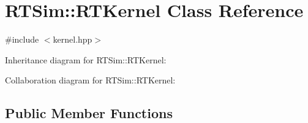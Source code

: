\hypertarget{classRTSim_1_1RTKernel}{}\section{R\+T\+Sim\+:\+:R\+T\+Kernel Class Reference}
\label{classRTSim_1_1RTKernel}


{\ttfamily \#include $<$kernel.\+hpp$>$}



Inheritance diagram for R\+T\+Sim\+:\+:R\+T\+Kernel\+:


Collaboration diagram for R\+T\+Sim\+:\+:R\+T\+Kernel\+:
\subsection*{Public Member Functions}
